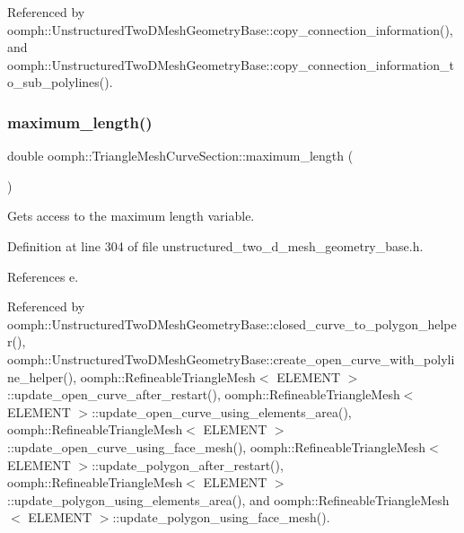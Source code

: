 Referenced by oomph\+::\+Unstructured\+Two\+D\+Mesh\+Geometry\+Base\+::copy\+\_\+connection\+\_\+information(), and oomph\+::\+Unstructured\+Two\+D\+Mesh\+Geometry\+Base\+::copy\+\_\+connection\+\_\+information\+\_\+to\+\_\+sub\+\_\+polylines().

\mbox{\label{classoomph_1_1TriangleMeshCurveSection_aee6ab6dbfd4e2f63da41bb8f66a43f53}} 
\subsubsection{\texorpdfstring{maximum\+\_\+length()}{maximum\_length()}}
{\footnotesize\ttfamily double oomph\+::\+Triangle\+Mesh\+Curve\+Section\+::maximum\+\_\+length (\begin{DoxyParamCaption}{ }\end{DoxyParamCaption})\hspace{0.3cm}{\ttfamily [inline]}}



Gets access to the maximum length variable. 



Definition at line 304 of file unstructured\+\_\+two\+\_\+d\+\_\+mesh\+\_\+geometry\+\_\+base.\+h.



References e.



Referenced by oomph\+::\+Unstructured\+Two\+D\+Mesh\+Geometry\+Base\+::closed\+\_\+curve\+\_\+to\+\_\+polygon\+\_\+helper(), oomph\+::\+Unstructured\+Two\+D\+Mesh\+Geometry\+Base\+::create\+\_\+open\+\_\+curve\+\_\+with\+\_\+polyline\+\_\+helper(), oomph\+::\+Refineable\+Triangle\+Mesh$<$ E\+L\+E\+M\+E\+N\+T $>$\+::update\+\_\+open\+\_\+curve\+\_\+after\+\_\+restart(), oomph\+::\+Refineable\+Triangle\+Mesh$<$ E\+L\+E\+M\+E\+N\+T $>$\+::update\+\_\+open\+\_\+curve\+\_\+using\+\_\+elements\+\_\+area(), oomph\+::\+Refineable\+Triangle\+Mesh$<$ E\+L\+E\+M\+E\+N\+T $>$\+::update\+\_\+open\+\_\+curve\+\_\+using\+\_\+face\+\_\+mesh(), oomph\+::\+Refineable\+Triangle\+Mesh$<$ E\+L\+E\+M\+E\+N\+T $>$\+::update\+\_\+polygon\+\_\+after\+\_\+restart(), oomph\+::\+Refineable\+Triangle\+Mesh$<$ E\+L\+E\+M\+E\+N\+T $>$\+::update\+\_\+polygon\+\_\+using\+\_\+elements\+\_\+area(), and oomph\+::\+Refineable\+Triangle\+Mesh$<$ E\+L\+E\+M\+E\+N\+T $>$\+::update\+\_\+polygon\+\_\+using\+\_\+face\+\_\+mesh().

